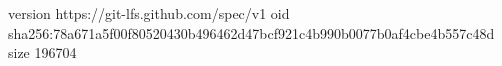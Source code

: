 version https://git-lfs.github.com/spec/v1
oid sha256:78a671a5f00f80520430b496462d47bcf921c4b990b0077b0af4cbe4b557c48d
size 196704
